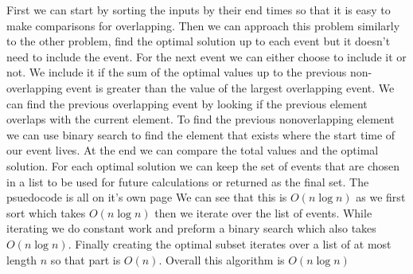 \documentclass{article}
\begin{document}
First we can start by sorting the inputs by their end times so that it is easy to make comparisons for overlapping.
Then we can approach this problem similarly to the other problem, find the optimal solution up to each event but it doesn't need to include the event.
For the next event we can either choose to include it or not.
We include it if the sum of the optimal values up to the previous non-overlapping event is greater than the value of the largest overlapping event.
We can find the previous overlapping event by looking if the previous element overlaps with the current element.
To find the previous nonoverlapping element we can use binary search to find the element that exists where the start time of our event lives.
At the end we can compare the total values and the optimal solution.
For each optimal solution we can keep the set of events that are chosen in a list to be used for future calculations or returned as the final set.
\newline
\newline
The psuedocode is all on it's own page
\newline
\newline
We can see that this is $O(n\log{n})$ as we first sort which takes $O(n\log{n})$ then we iterate over the list of events.
While iterating we do constant work and preform a binary search which also takes $O(n\log{n})$.
Finally creating the optimal subset iterates over a list of at most length $n$ so that part is $O(n)$.
Overall this algorithm is $O(n\log{n})$
\end{document}
